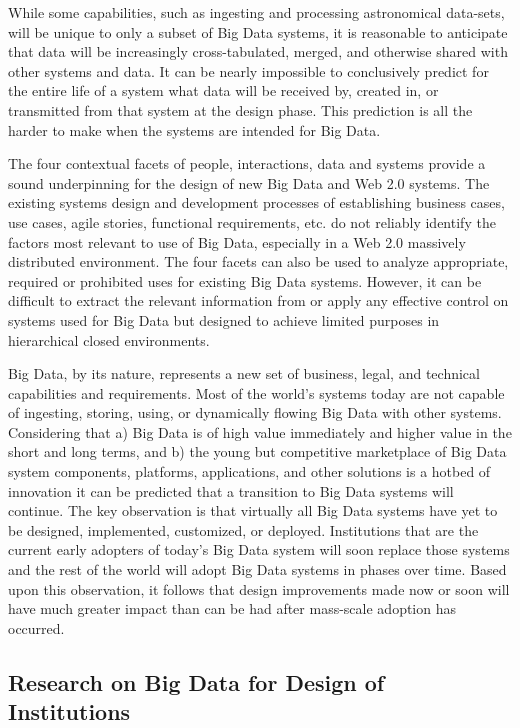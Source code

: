 While some capabilities, such as ingesting and processing astronomical data-sets, will be unique to only a subset of Big Data systems, it is reasonable to anticipate that data will be increasingly cross-tabulated, merged, and otherwise shared with other systems and data.
It can be nearly impossible to conclusively predict for the entire life of a system what data will be received by, created in, or transmitted from that system at the design phase.
This prediction is all the harder to make when the systems are intended for Big Data.

The four contextual facets of people, interactions, data and systems provide a sound underpinning for the design of new Big Data and Web 2.0 systems.
The existing systems design and development processes of establishing business cases, use cases, agile stories, functional requirements, etc. do not reliably identify the factors most relevant to use of Big Data, especially in a Web 2.0 massively distributed environment.
The four facets can also be used to analyze appropriate, required or prohibited uses for existing Big Data systems.
However, it can be difficult to extract the relevant information from or apply any effective control on systems used for Big Data but designed to achieve limited purposes in hierarchical closed environments.

Big Data, by its nature, represents a new set of business, legal, and technical capabilities and requirements.
Most of the world's systems today are not capable of ingesting, storing, using, or dynamically flowing Big Data with other systems.
Considering that a) Big Data is of high value immediately and higher value in the short and long terms, and b) the young but competitive marketplace of Big Data system components, platforms, applications, and other solutions is a hotbed of innovation it can be predicted that a transition to Big Data systems will continue.
The key observation is that virtually all Big Data systems have yet to be designed, implemented, customized, or deployed.
Institutions that are the current early adopters of today’s Big Data system will soon replace those systems and the rest of the world will adopt Big Data systems in phases over time.
Based upon this observation, it follows that design improvements made now or soon will have much greater impact than can be had after mass-scale adoption has occurred.  

\subsection{Research on Big Data for Design of Institutions}

